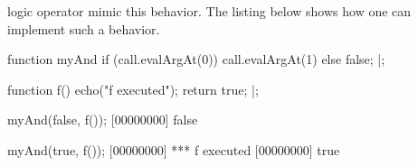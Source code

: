 \us logic operator mimic this behavior. The listing below shows how
one can implement such a behavior.

\begin{urbiscript}
function myAnd
{
  if (call.evalArgAt(0))
    call.evalArgAt(1)
  else
    false;
}|;

function f()
{
  echo("f executed");
  return true;
}|;

myAnd(false, f());
[00000000] false

myAnd(true, f());
[00000000] *** f executed
[00000000] true
\end{urbiscript}


